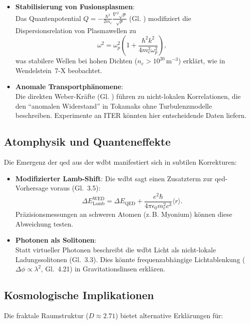 \begin{itemize}  
    \item \textbf{Stabilisierung von Fusionsplasmen}:\\Das Quantenpotential $Q = -\frac{\hbar^2}{2m_e} \frac{\nabla^2 \sqrt{\rho}}{\sqrt{\rho}}$ (Gl. ) modifiziert die Dispersionsrelation von Plasmawellen zu  
    \[
    \omega^2 = \omega_p^2 \left(1 + \frac{\hbar^2 k^2}{4m_e^2 \omega_p^2}\right),  
    \]  
    was stabilere Wellen bei hohen Dichten ($n_e > 10^{20}\, \text{m}^{-3}$) erklärt, wie in Wendelstein~7-X beobachtet.  

    \item \textbf{Anomale Transportphänomene}:\\Die direkten Weber-Kräfte (Gl. ) führen zu nicht-lokalen Korrelationen, die den \enquote{anomalen Widerstand} in Tokamaks ohne Turbulenzmodelle beschreiben. Experimente an ITER könnten hier entscheidende Daten liefern.
\end{itemize}  

\subsection{Atomphysik und Quanteneffekte}  
Die Emergenz der \gls{qed} aus der \gls{wdbt} manifestiert sich in subtilen Korrekturen:  

\begin{itemize}  
    \item \textbf{Modifizierter Lamb-Shift}:  
    Die \gls{wdbt} sagt einen Zusatzterm zur \gls{qed}-Vorhersage voraus (Gl.~3.5):
    \[
    \Delta E_{\text{Lamb}}^{\text{WED}} = \Delta E_{\text{QED}} + \frac{e^2 \hbar}{4\pi \epsilon_0 m_e^2 c^3} \langle r \rangle.  
    \]  
    Präzisionsmessungen an schweren Atomen (z.\,B. Myonium) können diese Abweichung testen.  

    \item \textbf{Photonen als Solitonen}:\\Statt virtueller Photonen beschreibt die \gls{wdbt} Licht als nicht-lokale Ladungssolitonen (Gl.~3.3). Dies könnte frequenzabhängige Lichtablenkung ($\Delta \phi \propto \lambda^2$, Gl.~4.21) in Gravitationslinsen erklären.  
\end{itemize}  

\subsection{Kosmologische Implikationen}  
Die fraktale Raumstruktur ($D \approx 2.71$) bietet alternative Erklärungen für:  

